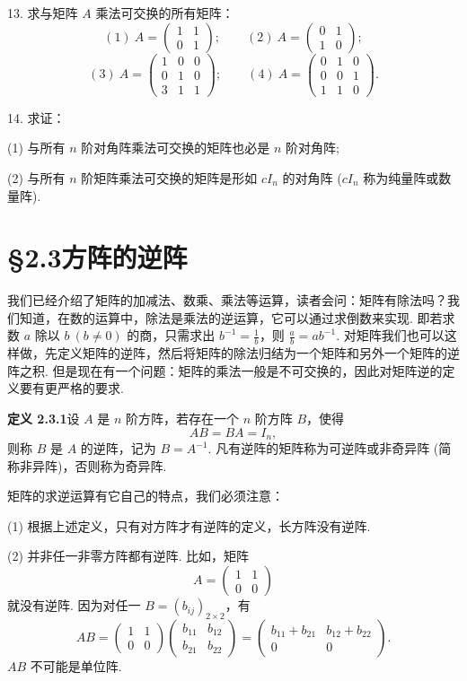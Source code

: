 \documentclass[UTF8,12pt,a4paper,fontset=fandol]{ctexart}
\begin{document}
13. 求与矩阵 $A$ 乘法可交换的所有矩阵：
\[
(1)\ A=\left(\begin{array}{cc}
1 & 1\\
0 & 1
\end{array}\right);
\qquad
(2)\ A=\left(\begin{array}{cc}
0 & 1\\
1 & 0
\end{array}\right);
\]
\[
(3)\ A=\left(\begin{array}{ccc}
1 & 0 & 0\\
0 & 1 & 0\\
3 & 1 & 1
\end{array}\right);
\qquad
(4)\ A=\left(\begin{array}{ccc}
0 & 1 & 0\\
0 & 0 & 1\\
1 & 1 & 0
\end{array}\right).
\]

14. 求证：

(1) 与所有 $n$ 阶对角阵乘法可交换的矩阵也必是 $n$ 阶对角阵;

(2) 与所有 $n$ 阶矩阵乘法可交换的矩阵是形如 $cI_n$ 的对角阵 ($cI_n$ 称为纯量阵或数量阵).

\section*{§2.3\quad 方阵的逆阵}

我们已经介绍了矩阵的加减法、数乘、乘法等运算，读者会问：矩阵有除法吗？我们知道，在数的运算中，除法是乘法的逆运算，它可以通过求倒数来实现. 即若求数 $a$ 除以 $b\ (b\ne 0)$ 的商，只需求出 $b^{-1}=\frac{1}{b}$，则 $\frac{a}{b}=ab^{-1}$. 对矩阵我们也可以这样做，先定义矩阵的逆阵，然后将矩阵的除法归结为一个矩阵和另外一个矩阵的逆阵之积. 但是现在有一个问题：矩阵的乘法一般是不可交换的，因此对矩阵逆的定义要有更严格的要求.

\noindent\textbf{定义 2.3.1}\quad 设 $A$ 是 $n$ 阶方阵，若存在一个 $n$ 阶方阵 $B$，使得
\[
AB=BA=I_n,
\]
则称 $B$ 是 $A$ 的逆阵，记为 $B=A^{-1}$. 凡有逆阵的矩阵称为可逆阵或非奇异阵 (简称非异阵)，否则称为奇异阵.

矩阵的求逆运算有它自己的特点，我们必须注意：

(1) 根据上述定义，只有对方阵才有逆阵的定义，长方阵没有逆阵.

(2) 并非任一非零方阵都有逆阵. 比如，矩阵
\[
A=\left(\begin{array}{cc}
1 & 1\\
0 & 0
\end{array}\right)
\]
就没有逆阵. 因为对任一 $B=(b_{ij})_{2\times 2}$，有
\[
AB=\left(\begin{array}{cc}
1 & 1\\
0 & 0
\end{array}\right)
\left(\begin{array}{cc}
b_{11} & b_{12}\\
b_{21} & b_{22}
\end{array}\right)
=
\left(\begin{array}{cc}
b_{11}+b_{21} & b_{12}+b_{22}\\
0 & 0
\end{array}\right).
\]
$AB$ 不可能是单位阵.
\end{document}
